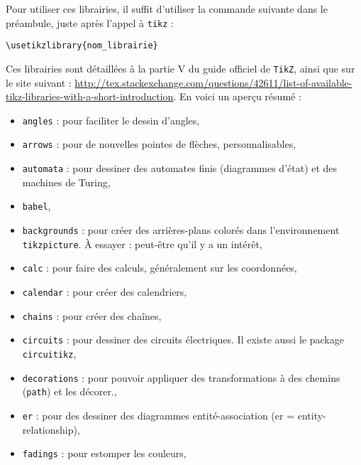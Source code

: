 Pour utiliser ces librairies, il suffit d'utiliser la commande suivante dans le préambule, juste après l'appel à \verb?tikz? : \begin{center} \verb?\usetikzlibrary{nom_librairie}? \end{center}

Ces librairies sont détaillées à la partie V du guide officiel de \texttt{TikZ}, ainsi que sur le site suivant : \url{http://tex.stackexchange.com/questions/42611/list-of-available-tikz-libraries-with-a-short-introduction}. En voici un aperçu résumé :

\begin{itemize}[label = , itemsep = \baselineskip] %
\item \verb?angles? : pour faciliter le dessin d'angles,

\item \verb?arrows? : pour de nouvelles pointes de flèches, personnalisables,

\item \verb?automata? : pour dessiner des automates finis (diagrammes d'état) et des machines de Turing,

\item \verb?babel?,

\item \verb?backgrounds? : pour créer des arrières-plans colorés dans l'environnement \verb?tikzpicture?. \`A essayer : peut-être qu'il y a un intérêt,

\item \verb?calc? : pour faire des calculs, généralement sur les coordonnées,

\item \verb?calendar? : pour créer des calendriers,

\item \verb?chains? : pour créer des chaînes,

\item \verb?circuits? : pour dessiner des circuits électriques. Il existe aussi le package \verb?circuitikz?,

\item \verb?decorations? : pour pouvoir appliquer des transformations à des chemins (\verb?path?) et les décorer.,

\item \verb?er? : pour des dessiner des diagrammes entité-association (er = entity-relationship),

\item \verb?fadings? : pour estomper les couleurs,


\end{itemize}
